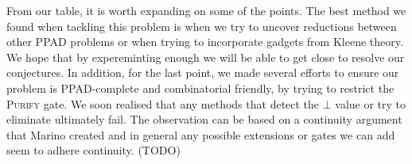 From our table, it is worth expanding on some of the points. The best method
we found when tackling this problem is when we try to uncover reductions between other
PPAD problems or when trying to incorporate gadgets from Kleene theory. We hope
that by expereminting enough we will be able to get close to resolve our conjectures.
In addition, for the last point, we made several efforts to ensure our problem is
\textsc{PPAD}-complete and combinatorial friendly, by trying to restrict the \textsc{Purify} gate. 
We soon realised that any methods that detect the $\bot$ value or try to eliminate ultimately
fail. The observation can be based on a continuity argument that Marino created
\cite{marino_GeneralTheoryMetastable_1981} and in general any possible extensions or gates we can
add seem to adhere continuity. (TODO)
